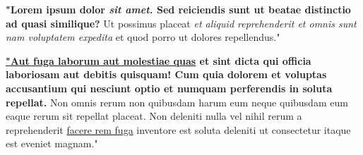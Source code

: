 \vspace{0.6cm}

\textbf{"Lorem ipsum dolor \emph{sit amet.} Sed reiciendis sunt ut beatae distinctio ad quasi similique?} Ut possimus placeat \emph{et aliquid reprehenderit et omnis sunt nam voluptatem expedita} et quod porro ut dolores repellendus."

\vspace{0.5cm}

\textbf{\underline
{"Aut fuga laborum aut molestiae quas} et sint dicta qui officia laboriosam aut debitis quisquam! Cum quia dolorem et voluptas accusantium qui nesciunt optio et numquam perferendis in soluta repellat.}
Non omnis rerum non quibusdam harum eum neque quibusdam eum eaque rerum sit repellat placeat. Non deleniti nulla vel nihil rerum a reprehenderit \underline{facere rem fuga} inventore est soluta deleniti ut consectetur itaque est eveniet magnam."
